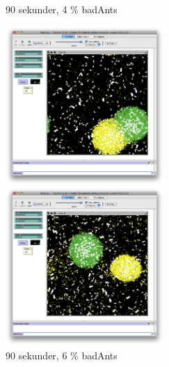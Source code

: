 \documentclass[titlepage, a4paper, 12pt]{article}
\begin{document}
\begin{figure}
  \begin{minipage}[b]{0.5\linewidth} %
    \centering
    \caption{90 sekunder, 4 \% badAnts}
    \includegraphics[width=6cm]{images/20-bad-90.png}
  \end{minipage}
  \hspace{0.5cm} %
  \begin{minipage}[b]{0.5\linewidth}
    \centering
    \caption{90 sekunder, 6 \% badAnts}
    \includegraphics[width=6cm]{images/30-bad-90.png}
  \end{minipage}
\end{figure}
\end{document}
